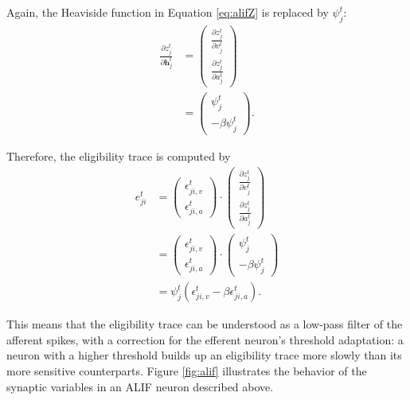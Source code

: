             Again, the Heaviside function in Equation \ref{eq:alifZ} is replaced by $\psi^t_j$:
            \begin{align}
                \frac{\partial z^t_j}{\partial\mathbf{h}^t_j} &= \begin{pmatrix}
                    \frac{\partial z^t_j}{\partial v^t_j}\\
                    \frac{\partial z^t_j}{\partial a^t_j}
                    \end{pmatrix}\\
                &= \begin{pmatrix}
                    \psi^t_j\\
                    -\beta\psi^t_j
                    \end{pmatrix}.
            \end{align}

            Therefore, the eligibility trace is computed by
            \begin{align}
               e^t_{ji} &= \begin{pmatrix}
            \epsilon_{ji, v}^t\\
            \epsilon_{ji, a}^t
            \end{pmatrix}\cdot \begin{pmatrix}
                    \frac{\partial z^t_j}{\partial v^t_j}\\
                    \frac{\partial z^t_j}{\partial a^t_j}
                    \end{pmatrix}\\
                &= \begin{pmatrix}
            \epsilon_{ji, v}^t\\
            \epsilon_{ji, a}^t
            \end{pmatrix}\cdot \begin{pmatrix}
                    \psi^t_j\\
                    -\beta\psi^t_j
                    \end{pmatrix}\\
                    &= \psi^t_j\left(\epsilon_{ji, v}^t - \beta\epsilon_{ji, a}^t\right).
            \end{align}


            This means that the eligibility trace can be understood as a low-pass filter of the afferent spikes, with a correction for the efferent neuron's threshold adaptation: a neuron with a higher threshold builds up an eligibility trace more slowly than its more sensitive counterparts.
            Figure \ref{fig:alif} illustrates the behavior of the synaptic variables in an ALIF neuron described above.

